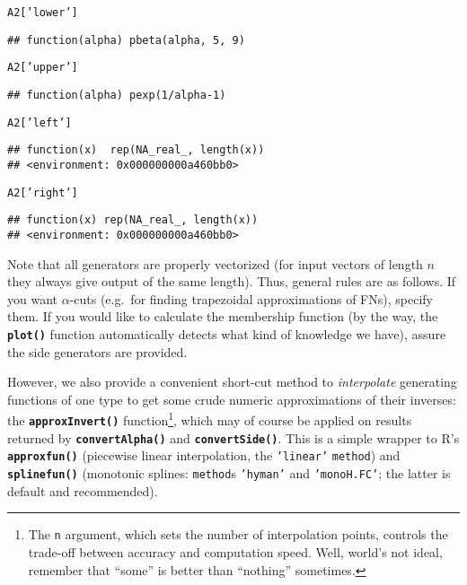 \documentclass[11pt]{article}\usepackage[]{graphicx}\usepackage[]{color}
\makeatletter
\newcommand{\hlstr}[1]{\textcolor[rgb]{0.192,0.494,0.8}{#1}}%
\newcommand{\hlstd}[1]{\textcolor[rgb]{0.345,0.345,0.345}{#1}}%
\newcommand{\hlkwc}[1]{\textcolor[rgb]{0.333,0.667,0.333}{#1}}%
\newcommand{\hlkwd}[1]{\textcolor[rgb]{0.737,0.353,0.396}{\textbf{#1}}}%
\newenvironment{kframe}{%
 \def\at@end@of@kframe{}%
 \ifinner\ifhmode%
  \def\at@end@of@kframe{\end{minipage}}%
  \begin{minipage}{\columnwidth}%
 \fi\fi%
 \def\FrameCommand##1{\hskip\@totalleftmargin \hskip-\fboxsep
 \colorbox{shadecolor}{##1}\hskip-\fboxsep
     \hskip-\linewidth \hskip-\@totalleftmargin \hskip\columnwidth}%
 \MakeFramed {\advance\hsize-\width
   \@totalleftmargin\z@ \linewidth\hsize
   \@setminipage}}%
 {\par\unskip\endMakeFramed%
 \at@end@of@kframe}
\newenvironment{knitrout}{}{} %
\newcommand{\lang}[1]{\textsf{#1}\xspace}
\newcommand{\R}{\lang{R}}
\newcommand{\func}[1]{\texttt{\hlkwd{#1}}}
\newcommand{\argument}[1]{\texttt{\hlkwc{#1}}}
\newcommand{\str}[1]{\texttt{\hlstr{#1}}}
\makeatother
\begin{document}
\begin{knitrout}\small
{}\color{fgcolor}\begin{kframe}
\begin{alltt}
\hlstd{A2[}\hlstr{'lower'}\hlstd{]}
\end{alltt}
\begin{verbatim}
## function(alpha) pbeta(alpha, 5, 9)
\end{verbatim}
\begin{alltt}
\hlstd{A2[}\hlstr{'upper'}\hlstd{]}
\end{alltt}
\begin{verbatim}
## function(alpha) pexp(1/alpha-1)
\end{verbatim}
\begin{alltt}
\hlstd{A2[}\hlstr{'left'}\hlstd{]}
\end{alltt}
\begin{verbatim}
## function(x)  rep(NA_real_, length(x))
## <environment: 0x000000000a460bb0>
\end{verbatim}
\begin{alltt}
\hlstd{A2[}\hlstr{'right'}\hlstd{]}
\end{alltt}
\begin{verbatim}
## function(x) rep(NA_real_, length(x))
## <environment: 0x000000000a460bb0>
\end{verbatim}
\end{kframe}
\end{knitrout}

\noindent
Note that all generators are properly vectorized (for
input vectors of length $n$ they always give output of the
same length).
Thus, general rules are as follows.
If you want $\alpha$-cuts (e.g.~for finding
trapezoidal approximations of FNs), specify them.
If you would like to calculate the membership function (by the way,
the \func{plot()} function
automatically detects what kind of knowledge we have),
assure the side generators are provided.


However, we also provide a convenient short-cut method
to \textit{interpolate} generating functions of one type
to get some crude numeric approximations of their inverses:
the \func{approxInvert()}
function\footnote{The
\argument{n} argument, which sets the number of interpolation points,
controls the trade-off between accuracy and computation speed.
Well, world's not ideal, remember that ``some'' is better than ``nothing''
sometimes.}, which may
of course be applied on results returned by
\func{convertAlpha()}
and \func{convertSide()}.
This is a simple wrapper to \R's \func{approxfun()}
(piecewise linear interpolation,
the \str{'{}linear'{}} \argument{method})
and \func{splinefun()} (monotonic
splines: \argument{method}s \str{'{}hyman{}'}
and \str{'{}monoH.FC'{}}; the latter is
default and recommended).
\end{document}

